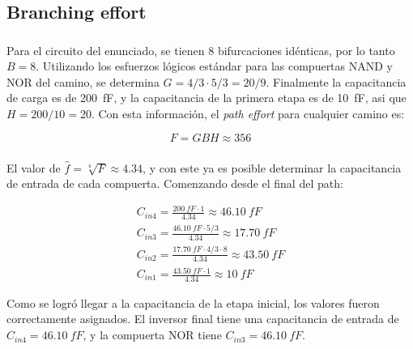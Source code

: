 \documentclass[letterpaper, 12pt]{article}
\numberwithin{equation}{section}
\begin{document}
\subsection{Branching effort}

\subsubsection{}

Para el circuito del enunciado, se tienen 8 bifurcaciones idénticas, por lo tanto \(B = 8\). Utilizando los esfuerzos lógicos estándar para las compuertas NAND y NOR del camino, se determina \(G = 4/3\cdot 5/3 = 20/9\). Finalmente la capacitancia de carga es de \SI{200}{fF}, y la capacitancia de la primera etapa es de \SI{10}{fF}, asi que \(H = 200/10 = 20\). Con esta información, el \emph{path effort} para cualquier camino es:

\begin{equation}
  F = GBH \approx 356
\end{equation}

\subsubsection{}

El valor de \(\hat{f} = \sqrt[4]{F} \approx 4.34 \), y con este ya es posible determinar la capacitancia de entrada de cada compuerta. Comenzando desde el final del path:

\begin{gather}
  C_{in4} = \frac{\SI{200}{fF}\cdot 1}{4.34} \approx \SI{46.10}{fF} \\
  C_{in3} = \frac{\SI{46.10}{fF}\cdot 5/3}{4.34} \approx \SI{17.70}{fF} \\
  C_{in2} = \frac{\SI{17.70}{fF}\cdot 4/3 \cdot 8}{4.34} \approx \SI{43.50}{fF} \\
  C_{in1} = \frac{\SI{43.50}{fF}\cdot 1}{4.34} \approx \SI{10}{fF}
\end{gather}

Como se logró llegar a la capacitancia de la etapa inicial, los valores fueron correctamente asignados. El inversor final tiene una capacitancia de entrada de \(C_{in4} = \SI{46.10}{fF}\), y la compuerta NOR tiene \(C_{in3} = \SI{46.10}{fF}\).
\end{document}
